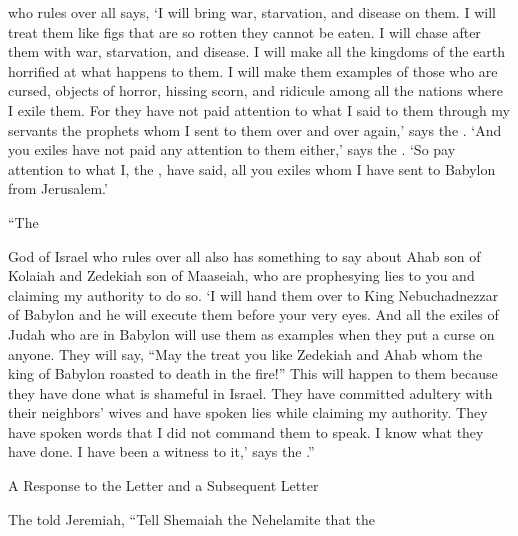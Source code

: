 {{}
who rules over all
says,
‘I will bring
war,
starvation,
and disease
on them. I will treat
them like figs
that
are so rotten
they cannot
be eaten.
I will chase
after
them with war,
starvation,
and disease.
I will make
all
the kingdoms
of the earth
horrified
at what happens to them. I will make them examples of those who are cursed,
objects of horror,
hissing
scorn,
and ridicule
among all
the nations
where
I exile them.
For
they have
not
paid attention
to
what
I said to them through my servants
the prophets
whom
I sent
to them over and over again,’
says
the {}. ‘And you exiles have not
paid any attention
to them either,’ says
the {}.
‘So pay attention
to what
I, the
{}, have said, all
you exiles
whom
I have sent
to Babylon
from Jerusalem.’
\par }{\PP {}“The

{}
God
of Israel
who rules over all
also has something to
say about Ahab
son
of Kolaiah
and Zedekiah
son
of Maaseiah,
who are prophesying
lies
to
you and claiming
my authority to
do so. ‘I
will
hand
them over to King
Nebuchadnezzar
of Babylon
and he will execute them
before your very eyes.
And all
the exiles
of Judah
who
are in Babylon
will use
them
as
examples
when they
put
a curse
on anyone. They will say,
“May the
{}
treat you like Zedekiah
and Ahab
whom
the king
of Babylon
roasted
to death in the fire!”
This will happen to them because
they have
done
what is shameful
in Israel.
They have committed adultery
with
their neighbors’
wives
and have spoken
lies
while claiming
my authority. They have spoken words
that
I did not
command
them to speak. I
know what
they have
done. I
have been
a witness
to it,’ says
the {}.”
\par }{\SH A Response to the Letter and a Subsequent Letter
\par }{\PP {}The
{} told Jeremiah, “Tell Shemaiah
the Nehelamite
that
the

}
